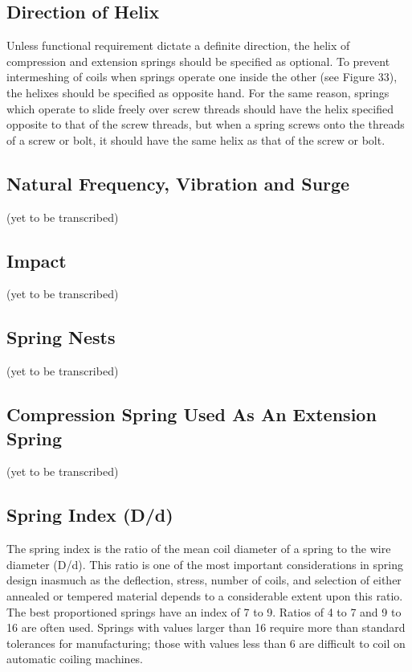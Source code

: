 \documentclass[10pt]{article}
\begin{document}
\subsection{Direction of Helix} %
Unless functional requirement dictate a definite direction, the helix of compression and extension springs should be specified as optional. 
To prevent intermeshing of coils when springs operate one inside the other (see Figure 33), the helixes should be specified as opposite hand. 
For the same reason, springs which operate to slide freely over screw threads should have the helix specified opposite to that of the screw threads, but when a spring screws onto the threads of a screw or bolt, it should have the same helix as that of the screw or bolt.

\subsection{Natural Frequency, Vibration and Surge} %

(yet to be transcribed)

\subsection{Impact} %
(yet to be transcribed)

\subsection{Spring Nests} %
(yet to be transcribed)

\subsection{Compression Spring Used As An Extension Spring} %
(yet to be transcribed)


\subsection{Spring Index (D/d)} %
The spring index is the ratio of the mean coil diameter of a spring to the wire diameter (D/d). 
This ratio is one of the most important considerations in spring design inasmuch as the deflection, stress, number of coils, and selection of either annealed or tempered material depends to a considerable extent upon this ratio. 
The best proportioned springs have an index of 7 to 9. 
Ratios of 4 to 7 and 9 to 16 are often used. 
Springs with values larger than 16 require more than standard tolerances for manufacturing; those with values less than
6 are difficult to coil on automatic coiling machines.
\end{document}
